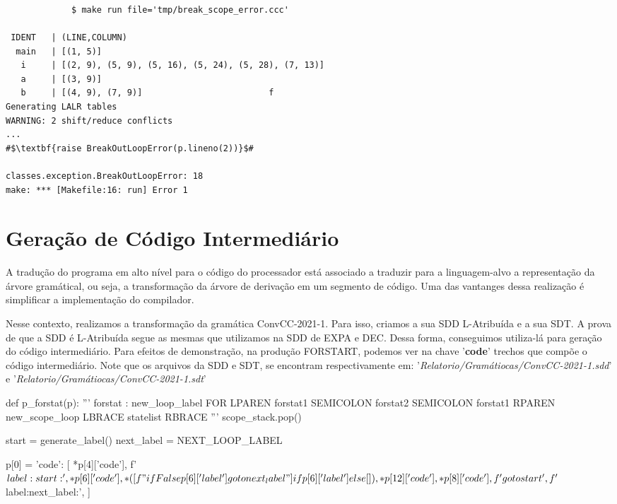 \documentclass[
	12pt,				%
	openright,			%
	twoside,			%
	a4paper,			%
	english,			%
	french,				%
	spanish,			%
	brazil				%
	]{abntex2}
\begin{document}
\begin{lstlisting}[escapechar=\#]



             $ make run file='tmp/break_scope_error.ccc'

 IDENT   | (LINE,COLUMN)                                                                                       
  main   | [(1, 5)]                                                                                            
   i     | [(2, 9), (5, 9), (5, 16), (5, 24), (5, 28), (7, 13)]                                                
   a     | [(3, 9)]                                                                                            
   b     | [(4, 9), (7, 9)]                         f                                                           
Generating LALR tables
WARNING: 2 shift/reduce conflicts
...
#$\textbf{raise BreakOutLoopError(p.lineno(2))}$#

classes.exception.BreakOutLoopError: 18
make: *** [Makefile:16: run] Error 1
\end{lstlisting}

\section{Geração de Código Intermediário}
A tradução do programa em alto nível para o código do processador
está associado a traduzir para a linguagem-alvo a representação
da árvore gramátical, ou seja, a transformação da árvore de derivação
em um segmento de código. Uma das vantanges dessa realização é
simplificar a implementação do compilador.

Nesse contexto, realizamos a transformação da gramática ConvCC-2021-1.
Para isso, criamos a sua SDD L-Atribuída e a sua SDT. A prova de que a SDD é L-Atribuída
segue as mesmas que utilizamos na SDD de EXPA e DEC. Dessa forma,
conseguimos utiliza-lá para geração do código intermediário. Para efeitos de demonstração, na produção FORSTART,
podemos ver na chave '\textbf{code}' trechos que compõe o código intermediário. 
Note que os arquivos da SDD e SDT, se encontram respectivamente em:
'\emph{Relatorio/Gramátiocas/ConvCC-2021-1.sdd}'
e '\emph{Relatorio/Gramátiocas/ConvCC-2021-1.sdt}'

\begin{python}
def p_forstat(p):
    '''
    forstat : new_loop_label FOR LPAREN forstat1 SEMICOLON forstat2 SEMICOLON forstat1 RPAREN new_scope_loop LBRACE statelist RBRACE
    '''
    scope_stack.pop()

    start = generate_label()
    next_label = NEXT_LOOP_LABEL

    p[0] = {
        'code': [
            *p[4]['code'],
            f'$label:{start}:',
            *p[6]['code'],
            *([f"if False {p[6]['label']} goto {next_label}"] if p[6]['label'] else []),
            *p[12]['code'],
            *p[8]['code'],
            f'goto {start}',
            f'$label:{next_label}:',
        ]
}
\end{python}
\end{document}
